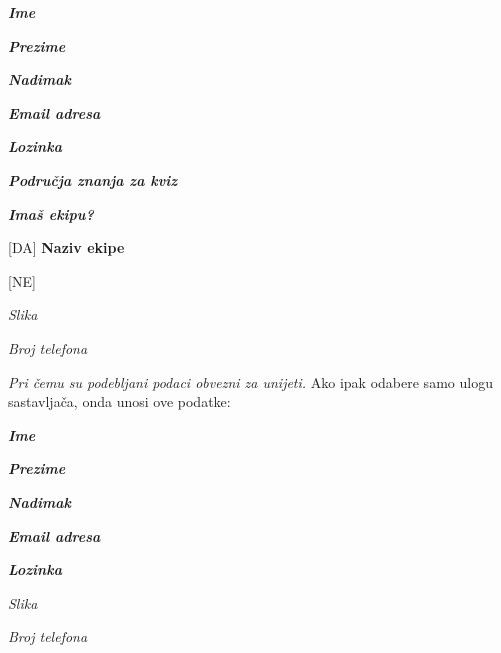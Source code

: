 		\begin{packed_item}
			\item \textit{\textbf{Ime}}
			\item \textit{\textbf{Prezime}}
			\item \textit{\textbf{Nadimak}}
			\item \textit{\textbf{Email adresa}}
			\item \textit{\textbf{Lozinka}}
			\item \textit{\textbf{Područja znanja za kviz}}
            \item \textit{\textbf{Imaš ekipu?}}
            \item[] \begin{packed_item}
            	\item {[DA]  \textbf{ Naziv ekipe}}
            	\item {[NE]}
           		    \end{packed_item}
            \item \textit{Slika}
           	\item \textit{Broj telefona}
            
		\end{packed_item}
		
		\textit{Pri čemu su podebljani podaci obvezni za unijeti.} Ako ipak odabere samo ulogu sastavljača, onda unosi ove podatke:
		\begin{packed_item}
			\item \textit{\textbf{Ime}}
			\item \textit{\textbf{Prezime}}
			\item \textit{\textbf{Nadimak}}
			\item \textit{\textbf{Email adresa}}
			\item \textit{\textbf{Lozinka}}
			\item \textit{Slika}
			\item \textit{Broj telefona}
			
		\end{packed_item}
	
